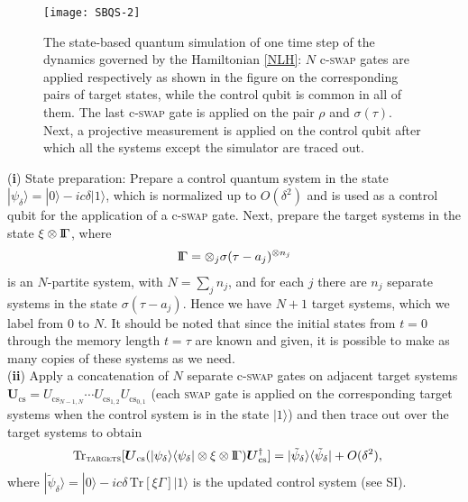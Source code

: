 \documentclass[aps,pra,twocolumn,floatfix,groupedaddress,superscriptaddress,nofootinbib,notitlepage]{revtex4-2}
\def\DSGamma{{\mathrm{I}\hskip-0.6mm\Gamma}}
\begin{document}
\begin{figure}
\texttt{[image: SBQS-2]}
\caption{The state-based quantum simulation of one time step of the dynamics governed by the Hamiltonian \eqref{NLH}: $N$ c-\textsc{swap} gates are applied respectively as shown in the figure on the corresponding pairs of target states, while the control qubit is common in all of them. The last c-\textsc{swap} gate is applied on the pair $\rho$ and $\sigma(\tau)$. Next, a projective measurement is applied on the control qubit after which all the systems except the simulator are traced out.}
\label{fig:NL-SBQS}
\end{figure}

(\textbf{i}) State preparation: Prepare a control quantum system in the state 
$|\psi_{\delta}\rangle= |0\rangle -i c \delta |1\rangle$, 
which is normalized up to $O(\delta^{2})$ and is used as a control qubit for the application of a c-\textsc{swap} gate. Next, prepare the target systems in the state $\xi \otimes \DSGamma$, where
\begin{align}
\DSGamma = \otimes_{j} \sigma(\tau-a_{j})^{\otimes n_{j}}
\end{align}
is an $N$-partite system, with $N=\sum_{j} n_{j}$, and for each $j$ there are $n_{j}$ separate systems in the state $\sigma(\tau-a_{j})$. Hence we have $N+1$ target systems, which we label from $0$ to $N$. It should be noted that since the initial states from $t=0$ through the memory length $t=\tau$ are known and given, it is possible to make as many copies of these systems as we need.\\

(\textbf{ii}) Apply a concatenation of $N$ separate c-\textsc{swap} gates on adjacent target systems $\boldsymbol{U}_{\text{cs}}=U_{\text{cs}_{N-1,N}}\cdots U_{\text{cs}_{1,2}}U_{\text{cs}_{0,1}}$ (each \textsc{swap} gate is applied on the corresponding target systems when the control system is in the state $|1\rangle$) and then trace out over the target systems to obtain 
\begin{align}
\mathrm{Tr}_{\textsc{targets}}[\boldsymbol{U}_{\text{cs}}&(|\psi_{\delta}\rangle\langle \psi_{\delta}|\otimes  \xi \otimes \DSGamma) \boldsymbol{U}^{\dag}_{\text{cs}}] 
= |\tilde{\psi}_{\delta}\rangle \langle \tilde{\psi}_{\delta}| + O(\delta^{2}),
\label{post-selection}
\end{align}
where $|\tilde{\psi}_{\delta}\rangle=|0\rangle-ic\delta\, \mathrm{Tr}[\xi\Gamma] |1\rangle$ is the updated control system (see SI).\\ 
\end{document}
